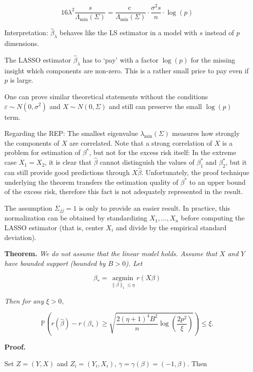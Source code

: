 \documentclass[
]{book}
\begin{document}
\[
16 \lambda^2 \frac{s}{\Lambda_{\min }(\Sigma)}=\frac{\text {c }}{\Lambda_{\min }(\Sigma)} \cdot \frac{\sigma^2 s}{n} \cdot \log (p)
\]

Interpretation: \(\hat{\beta}_\lambda\) behaves like the LS estimator in a model with \(s\) instead of \(p\) dimensions.

The LASSO estimator \(\hat{\beta}_\lambda\) has to `pay' with a factor \(\log (p)\) for the missing insight which components are non-zero. This is a rather small price to pay even if \(p\) is large.

One can prove similar theoretical statements without the conditions \(\varepsilon \sim N\left(0, \sigma^2\right)\) and \(X \sim N(0, \Sigma)\) and still can preserve the small \(\log (p)\) term.

Regarding the REP: The smallest eigenvalue \(\lambda_{\min }(\Sigma)\) measures how strongly the components of \(X\) are correlated. Note that a strong correlation of \(X\) is a problem for estimation of \(\beta^*\), but not for the excess risk itself: In the extreme case \(X_1=X_2\), it is clear that \(\hat{\beta}\) cannot distinguish the values of \(\beta_1^*\) and \(\beta_2^*\), but it can still provide good predictions through \(X \hat{\beta}\). Unfortunately, the proof technique underlying the theorem transfers the estimation quality of \(\beta^*\) to an upper bound of the excess risk, therefore this fact is not adequately represented in the result.

The assumption \(\Sigma_{j j}=1\) is only to provide an easier result. In practice, this normalization can be obtained by standardizing \(X_1, \ldots, X_n\) before computing the LASSO estimator (that is, center \(X_i\) and divide by the empirical standard deviation).

\textbf{Theorem.} \emph{We do not assume that the linear model holds. Assume that \(X\) and \(Y\) have bounded support (bounded by \(B>0\)). Let }

\[
\beta_*=\underset{\|\beta\|_1 \leq \eta}{\operatorname{argmin}} r(X\beta)
\]

\emph{Then for any \(\xi>0\),}

\[
\mathbb P\left (r(\widehat{\beta})- r\left(\beta_*\right)\geq\sqrt{\frac{2(\eta+1)^4 B^2}{n} \log \left(\frac{2p^2}{\xi}\right)}\right) \leq \xi  .
\]

\textbf{Proof.}

Set \(Z=(Y, X)\) and \(Z_i=\left(Y_i, X_i\right)\), \(\gamma = \gamma(\beta)=(-1, \beta)\). Then
\end{document}
